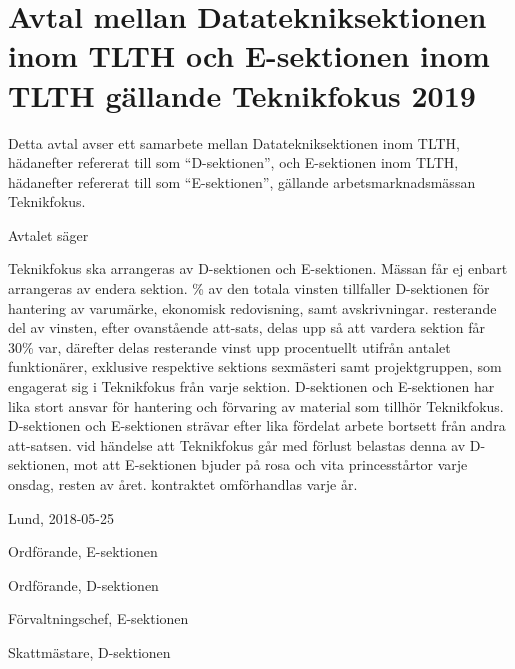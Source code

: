 \documentclass[10pt]{article}
\def\tfdate{2019}
\def\doctitle{Avtal mellan Datatekniksektionen inom TLTH och E-sektionen inom TLTH gällande Teknikfokus {\tfdate}}
\def\date{2018-05-25} %
\begin{document}
        \section*{\doctitle}
        Detta avtal avser ett samarbete mellan Datatekniksektionen inom TLTH, hädanefter refererat till som ``D-sektionen'', och E-sektionen inom TLTH, hädanefter refererat till som ``E-sektionen'', gällande arbetsmarknadsmässan Teknikfokus.
    
        Avtalet säger
        \begin{attsatser}
            \att Teknikfokus ska arrangeras av D-sektionen och E-sektionen. Mässan får ej enbart arrangeras av endera sektion.
            \% av den totala vinsten tillfaller D-sektionen för hantering av varumärke, ekonomisk redovisning, samt avskrivningar.
            \att resterande del av vinsten, efter ovanstående att-sats, delas upp så att vardera sektion får 30\% var, därefter delas resterande vinst upp procentuellt utifrån antalet funktionärer, exklusive respektive sektions sexmästeri samt projektgruppen, som engagerat sig i Teknikfokus från varje sektion.
            \att D-sektionen och E-sektionen har lika stort ansvar för hantering och förvaring av material som tillhör Teknikfokus.
            \att D-sektionen och E-sektionen strävar efter lika fördelat arbete bortsett från andra att-satsen.
            \att vid händelse att Teknikfokus går med förlust belastas denna av D-sektionen, mot att E-sektionen bjuder på rosa och vita princesstårtor varje onsdag, resten av året.
            \att kontraktet omförhandlas varje år.
        \end{attsatser}
    
        \begin{signatures}{4}
            Lund, \date
            \signature{Daniel Bakic}{Ordförande, E-sektionen}
            \signature{Anna Qvil}{Ordförande, D-sektionen}
            \signature{Magnus Lundh}{Förvaltningschef, E-sektionen}
            \signature{Fred Nordell}{Skattmästare, D-sektionen}
        \end{signatures}
    
    
\end{document}
